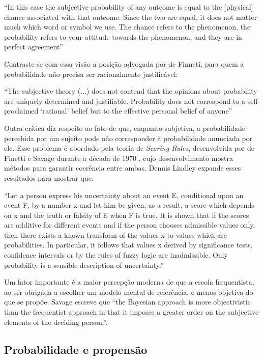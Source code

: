 \documentclass[12pt,a4paper]{article}
\begin{document}
``In this case the subjective probability of any outcome is equal to the [physical] chance associated with that outcome.
Since the two are equal, it does not matter much which word or symbol we use. The
chance refers to the phenomenon, the probability refers to your attitude
towards the phenomenon, and they are in perfect agreement''\cite{Anscombe63}

Contraste-se com essa visão a posição advogada por de Finneti, para quem a probabilidade não precisa ser racionalmente
justificável:

``The subjective theory (...) does not contend that the opinions about probability are uniquely determined and
justifiable. Probability does not correspond to a self-proclaimed `rational' belief but to the effective personal
belief of anyone''\cite{deFinetti51}

Outra crítica diz respeito ao fato de que, enquanto subjetiva, a probabilidade percebida por um sujeito pode não corresponder
à probabilidade anunciada por ele. Esse problema é abordado pela teoria de {\em Scoring Rules}, desenvolvida por
de Finetti e Savage durante a década de 1970 \cite{Lindley82}, cujo
desenvolvimento mostra métodos para garantir coerência entre ambas. Dennis Lindley expande esses resultados para mostrar que:

``Let a person express his uncertainty about an event E, conditional upon an event F, by a number x and let him be given, 
as a result, a score which depends on x and the truth or falsity of E when F is true. It is shown that if the scores are 
additive for different events and if the person chooses admissible values only, then there exists a known transform of the 
values x to values which are probabilities. In particular, it follows that values x derived by significance tests, confidence 
intervals or by the rules of fuzzy logic are inadmissible. Only probability is a sensible description of uncertainty.''
\cite{Lindley82}

Um fator importante é a maior percepção moderna
de que a escola frequentista, ao ser obrigada a escolher um modelo mental de referência, é menos objetiva do que se propõe.
Savage escreve que ``the Bayesian approach is more objectivistic than the frequentist approach in that it imposes a greater
order on the subjective elements of the deciding person.''\cite{Savage60}.	

\subsection{Probabilidade e propensão}
\end{document}
